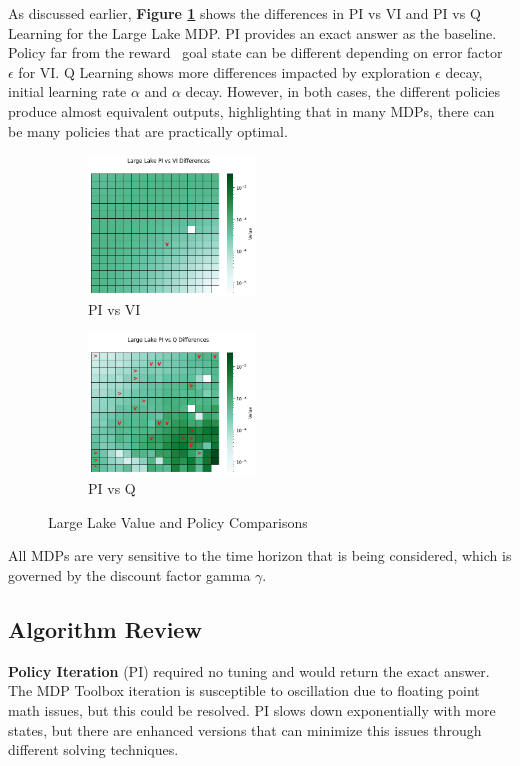 \documentclass[letterpaper]{article} %
\begin{document}
As discussed earlier, \textbf{Figure \ref{fig:large_lake_comparisions}} shows the differences in PI vs VI and PI vs Q Learning for the Large Lake MDP.  PI provides an exact answer as the baseline.  Policy far from the reward \ goal state can be different depending on error factor $\epsilon$ for VI.  Q Learning shows more differences impacted by exploration $\epsilon$ decay, initial learning rate $\alpha$ and  $\alpha$ decay.   However, in both cases, the different policies produce almost equivalent outputs, highlighting that in many MDPs, there can be many policies that are practically optimal.

\begin{figure}[!htb]
	\begin{subfigure}[b]{0.25\textwidth}
		\centering
		\includegraphics[width=1.75in]{Figures/Large_Lake_PI_vs_VI_Differences_.png}
		\caption{PI vs VI}
  	\end{subfigure}%
	\begin{subfigure}[b]{0.25\textwidth}
		\centering
		\includegraphics[width=1.75in]{Figures/Large_Lake_PI_vs_Q_Differences_.png}
		\caption{PI vs Q}
  	\end{subfigure}%
\caption{Large Lake Value and Policy Comparisons}
\label{fig:large_lake_comparisions}
\end{figure}

All MDPs are very sensitive to the time horizon that is being considered, which is governed by the discount factor gamma $\gamma$.  

\subsection{Algorithm Review}

\textbf{Policy Iteration} (PI) required no tuning and would return the exact answer.  The MDP Toolbox iteration is susceptible to oscillation due to floating point math issues, but this could be resolved.  PI slows down exponentially with more states, but there are enhanced versions that can minimize this issues through different solving techniques.  
\end{document}
